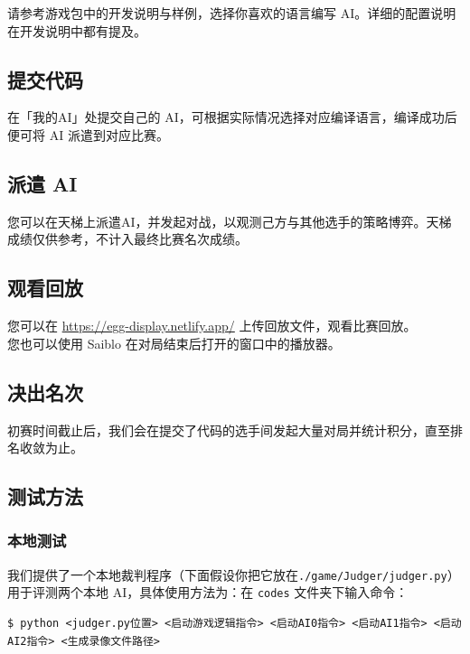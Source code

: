 \documentclass[UTF8]{article}
\begin{document}
请参考游戏包中的开发说明与样例，选择你喜欢的语言编写
AI。详细的配置说明在开发说明中都有提及。

\hypertarget{header-n41}{%
\subsection{提交代码}\label{header-n41}}

在「我的AI」处提交自己的
AI，可根据实际情况选择对应编译语言，编译成功后便可将 AI 派遣到对应比赛。

\hypertarget{header-n43}{%
\subsection{派遣 AI}\label{header-n43}}

您可以在天梯上派遣AI，并发起对战，以观测己方与其他选手的策略博弈。天梯成绩仅供参考，不计入最终比赛名次成绩。

\hypertarget{header-n45}{%
\subsection{观看回放}\label{header-n45}}

您可以在 \url{https://egg-display.netlify.app/} 上传回放文件，观看比赛回放。\\
您也可以使用 Saiblo 在对局结束后打开的窗口中的播放器。

\hypertarget{header-n47}{%
\subsection{决出名次}\label{header-n47}}

初赛时间截止后，我们会在提交了代码的选手间发起大量对局并统计积分，直至排名收敛为止。

\hypertarget{header-n49}{%
\subsection{测试方法}\label{header-n49}}

\hypertarget{header-n50}{%
\subsubsection{本地测试}\label{header-n50}}

我们提供了一个本地裁判程序（下面假设你把它放在\texttt{./game/Judger/judger.py}）
用于评测两个本地 AI，具体使用方法为：在 \texttt{codes} 文件夹下输入命令：

\begin{verbatim}
$ python <judger.py位置> <启动游戏逻辑指令> <启动AI0指令> <启动AI1指令> <启动AI2指令> <生成录像文件路径>
\end{verbatim}
\end{document}
